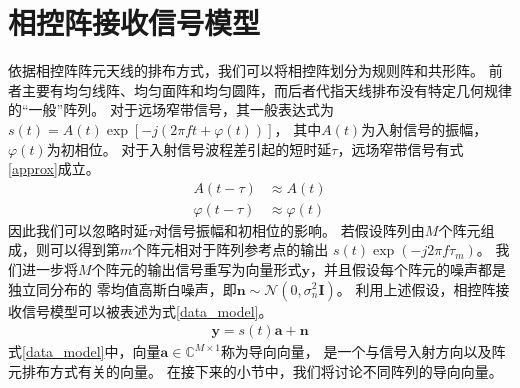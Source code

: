 \documentclass[master]{thesis-uestc}
\begin{document}
\section{相控阵接收信号模型}
依据相控阵阵元天线的排布方式，我们可以将相控阵划分为规则阵和共形阵。
前者主要有均匀线阵、均匀面阵和均匀圆阵，而后者代指天线排布没有特定几何规律的“一般”阵列。
对于远场窄带信号，其一般表达式为$s(t)=A(t)\exp\left[-j\left(2\pi ft+\varphi(t)\right)\right]$，
其中$A(t)$为入射信号的振幅，$\varphi(t)$为初相位。
对于入射信号波程差引起的短时延$\tau$，远场窄带信号有式\eqref{approx}成立。
\begin{equation}\label{approx}
\begin{aligned}
    A(t-\tau) &\approx A(t) \\
    \varphi(t-\tau) &\approx \varphi(t)
\end{aligned}
\end{equation}
因此我们可以忽略时延$\tau$对信号振幅和初相位的影响。
若假设阵列由$M$个阵元组成，则可以得到第$m$个阵元相对于阵列参考点的输出
$s(t)\exp\left(-j2\pi f\tau_m\right)$。
我们进一步将$M$个阵元的输出信号重写为向量形式$\bm{y}$，并且假设每个阵元的噪声都是独立同分布的
零均值高斯白噪声，即$\bm{n}\sim\mathcal{N}\left(0,\sigma^2_n\bm{I}\right)$。
利用上述假设，相控阵接收信号模型可以被表述为式\eqref{data_model}。
\begin{equation}\label{data_model}
    \begin{aligned}
        \bm{y} = s(t)\bm{a} + \bm{n}
    \end{aligned}
\end{equation}
式\eqref{data_model}中，向量$\bm{a}\in\mathbb{C}^{M\times1}$称为导向向量，
是一个与信号入射方向以及阵元排布方式有关的向量。
在接下来的小节中，我们将讨论不同阵列的导向向量。
\end{document}
